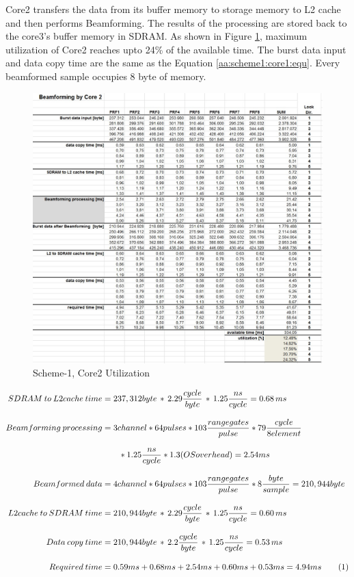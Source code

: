 Core2 transfers the data from its buffer memory to storage memory to L2 cache and then performs Beamforming. The results of the processing are stored back to the core3's buffer memory in SDRAM. As shown in Figure \ref{fig:existing_analysis:aa_scheme1_cpu_util2}, maximum utilization of Core2 reaches upto 24\% of the available time. The burst data input and data copy time are the same as the Equation \ref{aa:scheme1:core1:equ}. Every beamformed sample occupies 8 byte of memory.
\begin{figure}[h!]
	\centering
	\includegraphics[width=150mm]{figures/aa_scheme1_cpu_util_2}
	\caption{Scheme-1, Core2 Utilization}
	\label{fig:existing_analysis:aa_scheme1_cpu_util2}
\end{figure}

\begin{align*}
\label{aa:scheme1:core2:equ1}
	SDRAM \: to \: L2cache \: time &= 237,312 byte \, * \, 2.29\frac{cycle}{byte} \, * \, 1.25\frac{ns}{cycle} = 0.68 \, ms \\[0.3cm]
	Beamforming \: processing &= 3channel * 64pulses * 103 \frac{range gates}{pulse} * 79\frac{cycle}{8 element} \\[0.3cm] 
	&\qquad * 1.25\frac{ns}{cycle} * 1.3(OSoverhead) = 2.54ms\\[0.3cm]
	Beamformed \: data &= 4channel * 64pulses * 103 \frac{range gates}{pulse} *8\frac{byte}{sample} = 210,944byte \\[0.3cm]
	L2cache \: to \: SDRAM \: time &= 210,944 byte \, * \, 2.29\frac{cycle}{byte} \, * \, 1.25\frac{ns}{cycle} = 0.60 \, ms \\[0.3cm]
	Data \: copy \: time &= 210,944 byte \, * \, 2.2\frac{cycle}{byte} \, * \, 1.25\frac{ns}{cycle} = 0.53 \, ms \\[0.3cm]
	Required \: time &= 0.59ms + 0.68ms + 2.54ms + 0.60ms + 0.53ms = 4.94ms \stepcounter{equation}\tag{\theequation} 
\end{align*}

